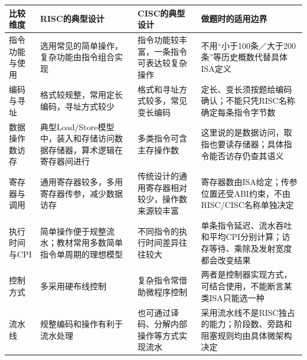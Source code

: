 \begin{wideblock}\par\medskip\noindent\begin{minipage}{\linewidth}\fontsize{9.3}{12}\selectfont\begin{tabularx}{\linewidth}{@{}YYYY@{}}
\toprule\noalign{}
\begin{minipage}[b]{\linewidth}\raggedright
比较维度
\end{minipage} & \begin{minipage}[b]{\linewidth}\raggedright
RISC的典型设计
\end{minipage} & \begin{minipage}[b]{\linewidth}\raggedright
CISC的典型设计
\end{minipage} & \begin{minipage}[b]{\linewidth}\raggedright
做题时的适用边界
\end{minipage} \\
\midrule\noalign{}


指令功能与使用 & 选用常见的简单操作，复杂功能由指令组合实现 & 指令功能较丰富，一条指令可表达较复杂操作 & 不用``小于100条／大于200条''等历史概数代替具体ISA定义 \\
编码与寻址 & 格式较规整，常用定长编码，寻址方式较少 & 格式和寻址方式较多，常见变长编码 & 定长、变长须按题给编码确认；不能只凭RISC名称确定每条指令字节数 \\
数据操作数访存 & 典型Load/Store模型中，装入和存储访问数据存储器，算术逻辑在寄存器间进行 & 多类指令可含主存操作数 & 这里说的是数据访问，取指也要读存储器；具体指令能否访存仍查其语义 \\
寄存器与调用 & 通用寄存器较多，多用寄存器传参，减少数据访存 & 传统设计的通用寄存器相对较少，操作数来源较丰富 & 寄存器数由ISA给定；传参位置还受ABI约束，不由RISC/CISC名称单独决定 \\
执行时间与CPI & 简单操作便于规整流水；教材常用多数简单指令单周期的理想模型 & 不同指令的执行时间差异往往较大 & 单条指令延迟、流水吞吐和平均CPI分别计算；访存等待、乘除及发射宽度都会改变结果 \\
控制方式 & 多采用硬布线控制 & 复杂指令常借助微程序控制 & 两者是控制器实现方式，可结合使用，不能断言某类ISA只能选一种 \\
流水线 & 规整编码和操作有利于流水处理 & 也可通过译码、分解内部操作等方式实现流水 & 采用流水线不是RISC独占的能力；阶段数、旁路和阻塞规则均由具体微架构决定 \\
\bottomrule\end{tabularx}
\end{minipage}\par\medskip\end{wideblock}

